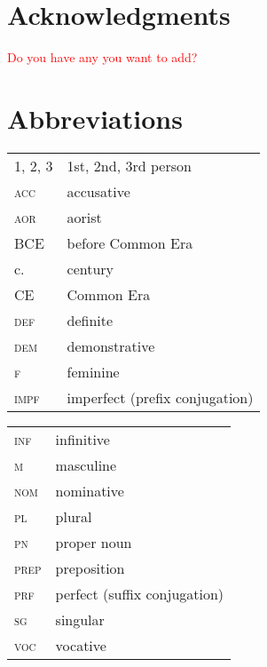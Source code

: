 \documentclass[output=paper]{langsci/langscibook}
\begin{document}
\section*{Acknowledgments}
\textcolor{red}{Do you have any you want to add?}

\section*{Abbreviations}

\begin{tabularx}{.5\textwidth}{@{}lQ@{}}
\textsc{1, 2, 3} & 1st, 2nd, 3rd person \\
\textsc{acc} & accusative \\
\textsc{aor} & aorist \\
BCE & before Common Era \\
c. & century \\
CE & Common Era \\
\textsc{def} & definite \\
\textsc{dem} & demonstrative \\
\textsc{f} & feminine \\
\textsc{impf} & imperfect (prefix conjugation) \\
\end{tabularx}%
\begin{tabularx}{.5\textwidth}{@{}lQ@{}}
\textsc{inf} & infinitive \\
\textsc{m} & masculine \\
\textsc{nom} & nominative \\
\textsc{pl} & plural \\
\textsc{pn} & proper noun \\
\textsc{prep} & preposition \\
\textsc{prf} & perfect (suffix conjugation) \\
\textsc{sg} & singular \\
\textsc{voc} & vocative \\
\end{tabularx}%


\sloppy
\printbibliography[heading=subbibliography,notkeyword=this] 
\end{document}
